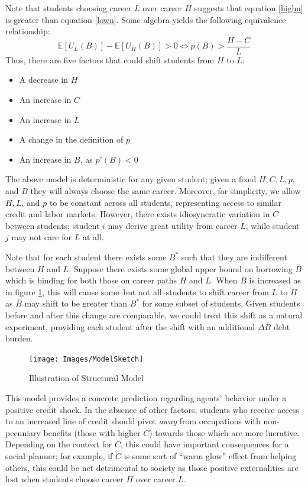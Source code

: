 \documentclass{article}
\begin{document}
	Note that students choosing career $L$ over career $H$ suggests that equation \ref{highu} is greater than equation \ref{lowu}. Some algebra yields the following equivalence relationship: 
	$$\mathbb{E}\left[U_L(B)\right] - \mathbb{E}\left[U_H(B)\right] > 0 \iff p(B) > \frac{H - C}{L} \label{choicecon}$$ 
	Thus, there are five factors that could shift students from $H$ to $L$:
	\begin{itemize}
		\singlespacing
		\item A decrease in $H$
		\item An increase in $C$
		\item An increase in $L$
		\item A change in the definition of $p$
		\item An increase in $B$, as $p'(B) < 0$
	\end{itemize}

	The above model is deterministic for any given student; given a fixed $H, C, L, p,$ and $B$ they will always choose the same career. Moreover, for simplicity, we allow $H, L$, and $p$ to be constant across all students, representing access to similar credit and labor markets. However, there exists idiosyncratic variation in $C$ between students; student $i$ may derive great utility from career $L$, while student $j$ may not care for $L$ at all.

	Note that for each student there exists some $B^*$ such that they are indifferent between $H$ and $L$. Suppose there exists some global upper bound on borrowing $\bar{B}$ which is binding for both those on career paths $H$ and $L$. When $\bar{B}$ is increased as in figure \ref{struc}, this will cause some--but not all--students to shift career from $L$ to $H$ as $\bar{B}$ may shift to be greater than $B^*$ for some subset of students. Given students before and after this change are comparable, we could treat this shift as a natural experiment, providing each student after the shift with an additional $\Delta\bar{B}$ debt burden. 
	
		
	\begin{figure}
		\centering
		\caption{Illustration of Structural Model}
		\label{struc}
		\texttt{[image: Images/ModelSketch]}
	\end{figure}

	This model provides a concrete prediction regarding agents' behavior under a positive credit shock. In the absence of other factors, students who receive access to an increased line of credit should pivot \emph{away} from occupations with non-pecuniary benefits (those with higher $C$) towards those which are more lucrative. Depending on the context for $C$, this could have important consequences for a social planner; for example, if $C$ is some sort of ``warm glow'' effect from helping others, this could be net detrimental to society as those positive externalities are lost when students choose career $H$ over career $L$. 
\end{document}
